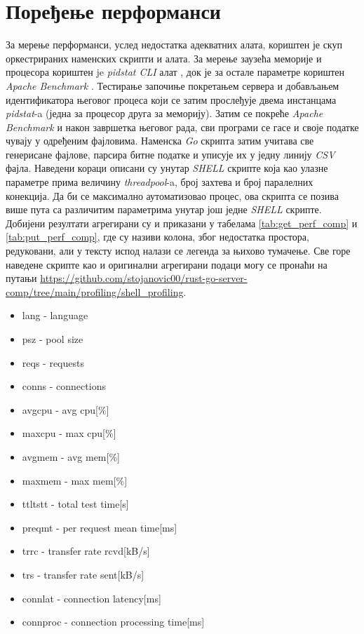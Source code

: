 \section{Поређење перформанси}

За мерење перформанси, услед недостатка адекватних алата, кориштен је скуп оркестрираних наменских скрипти и алата. За мерење заузећа меморије и процесора кориштен je \textit{pidstat CLI} алат \cite{pidstat}, док је за остале параметре кориштен \textit{Apache Benchmark} \cite{ab}. Тестирање започиње покретањем сервера и добављањем идентификатора његовог процеса који се затим прослеђује двема инстанцама \textit{pidstat}-a (једна за процесор друга за меморију). Затим се покреће \textit{Apache Benchmark} и након завршетка његовог рада, сви програми се гасе и своје податке чувају у одређеним фајловима. Наменска \textit{Go} скрипта затим учитава све генерисане фајлове, парсира битне податке и уписује их у једну линију \textit{CSV} фајла. Наведени кораци описани су унутар \textit{SHELL} скрипте која као улазне параметре прима величину \textit{threadpool}-a, број захтева и број паралелних конекција. Да би се максимално аутоматизовао процес, ова скрипта се позива више пута са различитим параметрима унутар још једне \textit{SHELL} скрипте. Добијени резултати агрегирани су и приказани у табелама \ref{tab:get_perf_comp} и \ref{tab:put_perf_comp}, где су називи колона, због недостатка простора, редуковани, али у тексту испод налази се легенда за њихово тумачење. Све горе наведене скрипте као и оригинални агрегирани подаци могу се пронаћи на путањи \url{https://github.com/stojanovic00/rust-go-server-comp/tree/main/profiling/shell_profiling}.

\begin{itemize}
    \item lang - language
\item psz - pool size
\item reqs - requests
\item conns - connections
\item avgcpu - avg cpu[\%]
\item maxcpu - max cpu[\%]
\item avgmem - avg mem[\%]
\item maxmem - max mem[\%]
\item ttltstt - total test time[s]
\item preqmt - per request mean time[ms]
\item trrc - transfer rate rcvd[kB/s]
\item trs - transfer rate sent[kB/s]
\item connlat - connection latency[ms]
\item connproc - connection processing time[ms]
\end{itemize}\\


